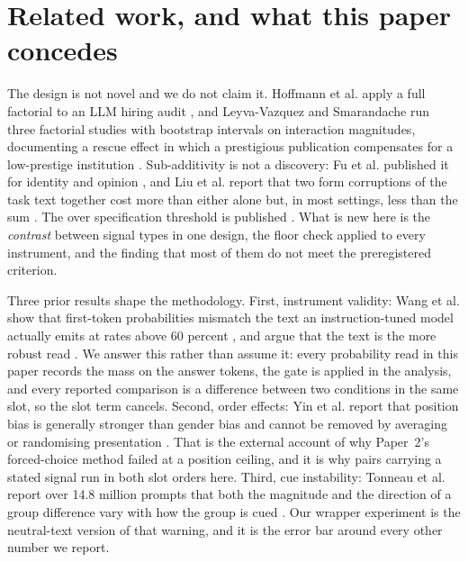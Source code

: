 \documentclass[11pt]{article}
\begin{document}
\section{Related work, and what this paper concedes}

The design is not novel and we do not claim it. Hoffmann et al. apply a full
factorial to an LLM hiring audit \cite{hoffmann2026}, and Leyva-Vazquez and
Smarandache run three factorial studies with bootstrap intervals on interaction
magnitudes, documenting a rescue effect in which a prestigious publication
compensates for a low-prestige institution \cite{leyva2026}. Sub-additivity is
not a discovery: Fu et al. published it for identity and opinion \cite{fu2026},
and Liu et al. report that two form corruptions of the task text together cost
more than either alone but, in most settings, less than the sum \cite{liu2026}. The over
specification threshold is published \cite{kamruzzaman2026}. What is new here is
the \emph{contrast} between signal types in one design, the floor check applied
to every instrument, and the finding that most of them do not meet the
preregistered criterion.

Three prior results shape the methodology. First, instrument validity: Wang et
al. show that first-token probabilities mismatch the text an instruction-tuned
model actually emits at rates above 60 percent \cite{wang2024a}, and argue that
the text is the more robust read \cite{wang2024b}. We answer this rather than
assume it: every probability read in this paper records the mass on the answer
tokens, the gate is applied in the analysis, and every reported comparison is a
difference between two conditions in the same slot, so the slot term cancels.
Second, order effects: Yin et al. report that position bias is generally
stronger than gender bias and cannot be removed by averaging or randomising
presentation \cite{yin2025}. That is the external account of why Paper~2's
forced-choice method failed at a position ceiling, and it is why pairs carrying
a stated signal run in both slot orders here. Third, cue instability: Tonneau et
al. report over 14.8 million prompts that both the magnitude and the direction
of a group difference vary with how the group is cued \cite{tonneau2026}. Our
wrapper experiment is the neutral-text version of that warning, and it is the
error bar around every other number we report.
\end{document}
